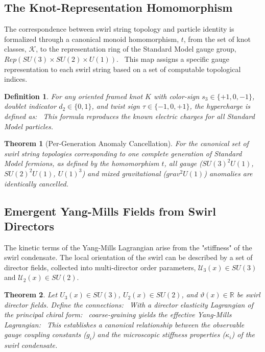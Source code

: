 \documentclass[11pt]{article}
\newtheorem{theorem}{Theorem}[section]
\newtheorem{definition}{Definition}[section]
\begin{document}
\subsection{The Knot-Representation Homomorphism}
    The correspondence between swirl string topology and particle identity is formalized through a canonical monoid homomorphism, $t$, from the set of knot classes, $\mathcal{K}$, to the representation ring of the Standard Model gauge group, $Rep(SU(3)\times SU(2)\times U(1))$.
    \
    This map assigns a specific gauge representation to each swirl string based on a set of computable topological indices.
    \begin{definition}
    For any oriented framed knot $K$ with color-sign $s_3 \in \{+1, 0, -1\}$, doublet indicator $d_2 \in \{0, 1\}$, and twist sign $\tau \in \{-1, 0, +1\}$, the hypercharge is defined as:
    \
    This formula reproduces the known electric charges for all Standard Model particles.
    \end{definition}

    \begin{theorem}[Per-Generation Anomaly Cancellation]
    For the canonical set of swirl string topologies corresponding to one complete generation of Standard Model fermions, as defined by the homomorphism $t$, all gauge ($SU(3)^2U(1)$, $SU(2)^2U(1)$, $U(1)^3$) and mixed gravitational ($grav^2U(1)$) anomalies are identically cancelled.
    \end{theorem}

\subsection{Emergent Yang-Mills Fields from Swirl Directors}
    The kinetic terms of the Yang-Mills Lagrangian arise from the "stiffness" of the swirl condensate. The local orientation of the swirl can be described by a set of director fields, collected into multi-director order parameters, $\mathcal{U}_3(x) \in SU(3)$ and $\mathcal{U}_2(x) \in SU(2)$.

    \begin{theorem}
    Let $U_3(x) \in SU(3)$, $U_2(x) \in SU(2)$, and $\vartheta(x) \in \mathbb{R}$ be swirl director fields. Define the connections:
    \
    With a director elasticity Lagrangian of the principal chiral form:
    \
    coarse-graining yields the effective Yang-Mills Lagrangian:
    \
    This establishes a canonical relationship between the observable gauge coupling constants ($g_i$) and the microscopic stiffness properties ($\kappa_i$) of the swirl condensate.
    \end{theorem}
\end{document}
